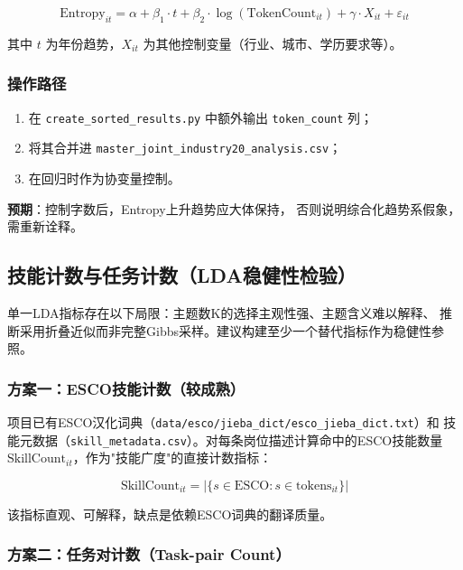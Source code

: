 \documentclass[12pt,a4paper]{ctexart}
\begin{document}
\begin{equation}
\text{Entropy}_{it} = \alpha + \beta_1 \cdot t + \beta_2 \cdot \log(\text{TokenCount}_{it}) + \gamma \cdot X_{it} + \varepsilon_{it}
\end{equation}

其中 $t$ 为年份趋势，$X_{it}$ 为其他控制变量（行业、城市、学历要求等）。

\subsubsection{操作路径}

\begin{enumerate}
    \item 在 \texttt{create\_sorted\_results.py} 中额外输出 \texttt{token\_count} 列；
    \item 将其合并进 \texttt{master\_joint\_industry20\_analysis.csv}；
    \item 在回归时作为协变量控制。
\end{enumerate}

\textbf{预期}：控制字数后，Entropy上升趋势应大体保持，
否则说明综合化趋势系假象，需重新诠释。

\subsection{技能计数与任务计数（LDA稳健性检验）}
\label{sec:plan_skill}

单一LDA指标存在以下局限：主题数K的选择主观性强、主题含义难以解释、
推断采用折叠近似而非完整Gibbs采样。建议构建至少一个替代指标作为稳健性参照。

\subsubsection{方案一：ESCO技能计数（较成熟）}

项目已有ESCO汉化词典（\texttt{data/esco/jieba\_dict/esco\_jieba\_dict.txt}）和
技能元数据（\texttt{skill\_metadata.csv}）。对每条岗位描述计算命中的ESCO技能数量
$\text{SkillCount}_{it}$，作为"技能广度"的直接计数指标：

\begin{equation}
\text{SkillCount}_{it} = \left|\{s \in \text{ESCO} : s \in \text{tokens}_{it}\}\right|
\end{equation}

该指标直观、可解释，缺点是依赖ESCO词典的翻译质量。

\subsubsection{方案二：任务对计数（Task-pair Count）}
\end{document}
